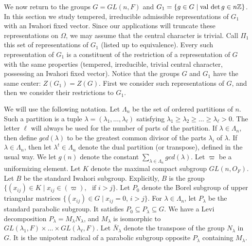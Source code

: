 \newpage\noindent
{}

\medskip\noindent
We now return to the groups $ G=GL(n,F) $
and 
  $G_1=\{g\in G\mid \text{val\,}\det g\in n{\Bbb Z}\}$.
In this section we study tempered, irreducible admissible
  representations of $G_1$ with an Iwahori fixed vector.  Since our applications 
  will truncate these representations on $\Omega$, we
  may assume that the central character is trivial.
Call 
  $ \Pi_1$
this set of representations of $G_1$
  (listed up to equivalence).
Every such representation of $G_1$ is a constituent
  of the restriction of a representation of $G$ with 
  the same properties (tempered, irreducible, trivial central character,
   possessing an Iwahori fixed vector).
Notice that the groups $G$ and $G_1$ have the same center:
  $Z(G_1) = Z(G)$.
First we consider such representations of 
$G$, and then we consider their restrictions to $G_1$.

We will use the following notation.  
Let $\Lambda_n$ be
  the set of ordered partitions of $n$.  Such a partition is a tuple
  $ \lambda = (\lambda_1, \dots , \lambda_{\ell})$ satisfying
    $\lambda_1 \geq \lambda_2 \geq \dots \geq\lambda_{\ell} > 0 $.
    The letter $\ell$ will always be used for the number of
    parts of the partition.
  If 
  $ \lambda \in \Lambda_n$, then define  $gcd (\lambda)$ to be the
  greatest common divisor of the parts
  $ \lambda_i$ of $\lambda$.
  If $\lambda\in \Lambda_n$, then let $\lambda^t\in\Lambda_n$ 
  denote the dual partition (or transpose), defined in the usual way.
We let $g(n)$ denote the constant
  $ \sum\limits_{\lambda \in \Lambda_n}
  gcd (\lambda) $.
%
Let 
$\varpi$ be
  a uniformizing element.  Let $K$ denote the maximal
  compact subgroup $GL(n,O_F)$.  Let
$B$ be the standard Iwahori subgroup.  Explicitly, $B$ is the group
  $ \{
      (x_{ij}) \in K \mid
       x_{ij} \in (\varpi), \,\,
    \text{ if }  i > j
    \} $.
Let $P_0$ denote the 
    Borel subgroup of upper triangular matrices
      $ \{ (x_{ij}) \in G \mid x_{ij} = 0 $,
      $ i > j \} $.
%
For $\lambda\in \Lambda_n$, let $P_\lambda$ be the
    standard parabolic subgroup.  It satisfies
      $ P_0 \subseteq P_{\lambda} \subseteq G $.
%
We have a Levi decomposition
$P_{\lambda}=M_{\lambda}N_{\lambda}$,
and
      $ M_{\lambda} $
    is isomorphic to 
      $ GL(\lambda_1, F)\times \dots \times 
        GL(\lambda_{\ell}, F) $.
%
Let $\bar N_\lambda$ denote the transpose of the group
$N_\lambda$ in $G$.  It is the unipotent radical of a
parabolic subgroup opposite $P_\lambda$ containing $M_\lambda$.



